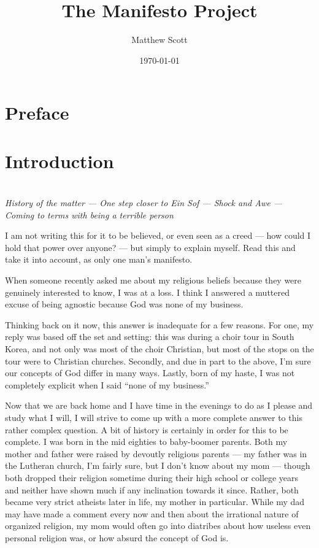 \documentclass{book}
\begin{document}
\frontmatter
\title{The Manifesto Project}
\author{Matthew Scott}
\date{\today}
\maketitle

\chapter*{Preface}

\chapter*{Introduction}

\mainmatter

\chapter{}
\begin{center}
	\emph{History of the matter --- One step closer to Ein Sof --- Shock and Awe --- Coming to terms with being a terrible person}
\end{center}

I am not writing this for it to be believed, or even seen as a creed --- how could I hold that power over anyone? --- but simply to explain myself.  Read this and take it into account, as only one man's manifesto.

When someone recently asked me about my religious beliefs because they were genuinely interested to know, I was at a loss.  I think I answered a muttered excuse of being agnostic because God was none of my business.

Thinking back on it now, this answer is inadequate for a few reasons.  For one, my reply was based off the set and setting: this was during a choir tour in South Korea, and not only was most of the choir Christian, but most of the stops on the tour were to Christian churches.  Secondly, and due in part to the above, I'm sure our concepts of God differ in many ways.  Lastly, born of my haste, I was not completely explicit when I said ``none of my business.''

Now that we are back home and I have time in the evenings to do as I please and study what I will, I will strive to come up with a more complete answer to this rather complex question.
A bit of history is certainly in order for this to be complete.  I was born in the mid eighties to baby-boomer parents.  Both my mother and father were raised by devoutly religious parents --- my father was in the Lutheran church, I'm fairly sure, but I don't know about my mom --- though both dropped their religion sometime during their high school or college years and neither have shown much if any inclination towards it since.  Rather, both became very strict atheists later in life, my mother in particular.  While my dad may have made a comment every now and then about the irrational nature of organized religion, my mom would often go into diatribes about how useless even personal religion was, or how absurd the concept of God is.
\end{document}
